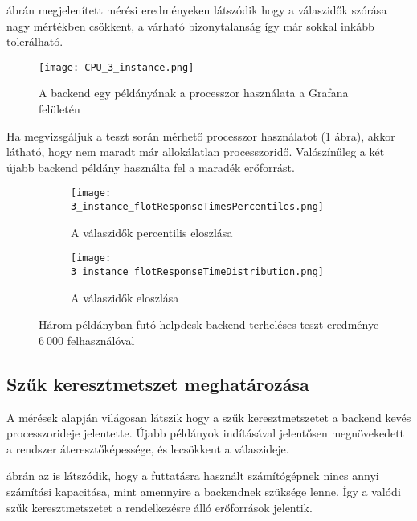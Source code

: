  ábrán megjelenített mérési eredményeken látszódik hogy a válaszidők szórása nagy mértékben csökkent, a várható bizonytalanság így már sokkal inkább tolerálható.



\begin{figure}[hbt] 
	\centering
	\texttt{[image: CPU\_3\_instance.png]}
	\caption{A backend egy példányának a processzor használata a Grafana felületén}
	\label{fig:3_instance_CPU}
\end{figure}



Ha megvizsgáljuk a teszt során mérhető processzor használatot (\ref{fig:3_instance_CPU} ábra), akkor látható, hogy nem maradt már allokálatlan processzoridő. Valószínűleg a két újabb backend példány használta fel a maradék erőforrást.

\begin{figure}[!hbt]
	\begin{subfigure}{.9\textwidth}
		\centering
		\texttt{[image: 3\_instance\_flotResponseTimesPercentiles.png]}  
		\caption{A válaszidők percentilis eloszlása}
	\end{subfigure}
	\begin{subfigure}{.9\textwidth}
		\centering
		\texttt{[image: 3\_instance\_flotResponseTimeDistribution.png]}  
		\caption{A válaszidők eloszlása}
	\end{subfigure}
	
	\caption[Helpdesk backend terheléses teszt három példánnyal]{Három példányban futó helpdesk backend terheléses teszt eredménye $6~000$ felhasználóval}
	\label{fig:3_instance}
\end{figure}



\subsection{Szűk keresztmetszet meghatározása}\label{sec:szuk_keresztmetszet}
A mérések alapján világosan látszik hogy a szűk keresztmetszetet a backend kevés processzorideje jelentette. Újabb példányok indításával jelentősen megnövekedett a rendszer áteresztőképessége, és lecsökkent a válaszideje.

 ábrán az is látszódik, hogy a futtatásra használt számítógépnek nincs annyi számítási kapacitása, mint amennyire a backendnek szüksége lenne. Így a valódi szűk keresztmetszetet a rendelkezésre álló erőforrások jelentik.


